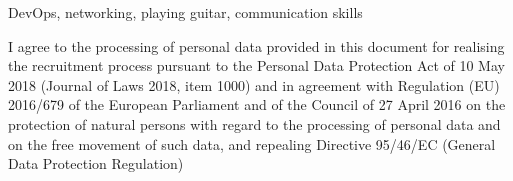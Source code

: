 \documentclass{cvClass} %
\begin{document}

   {DevOps, networking, playing guitar, communication skills}

  \vfill
    {I agree to the processing of personal data provided in this document for realising the recruitment process pursuant to the Personal Data Protection Act of 10 May 2018 (Journal of Laws 2018, item 1000) and in agreement with Regulation (EU) 2016/679 of the European Parliament and of the Council of 27 April 2016 on the protection of natural persons with regard to the processing of personal data and on the free movement of such data, and repealing Directive 95/46/EC (General Data Protection Regulation)}

\end{document}
